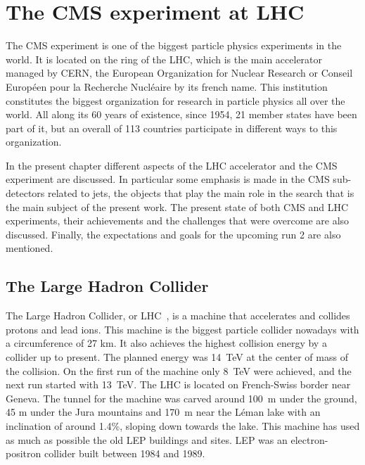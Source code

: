 \chapter[The CMS experiment at LHC]{The CMS experiment at LHC}

The CMS experiment is one of the biggest particle physics experiments in the world. It is located on the ring of the LHC, which is the main accelerator managed by CERN, the European Organization for Nuclear Research or Conseil Europ\'{e}en pour la Recherche Nucl\'{e}aire by its french name. This institution constitutes the biggest organization for research in particle physics all over the world. All along its 60 years of existence, since 1954, 21 member states have been part of it, but an overall of 113 countries participate in different ways to this organization. 

In the present chapter different aspects of the LHC accelerator and the CMS experiment are discussed. In particular some emphasis is made in the CMS sub-detectors related to jets, the objects that play the main role in the search that is the main subject of the present work. The present state of both CMS and LHC experiments, their achievements and the challenges that were overcome are also discussed. Finally, the expectations and goals for the upcoming run 2 are also mentioned.  

\section{The Large Hadron Collider}
\label{sec:LHC}

The Large Hadron Collider, or LHC~\cite{Bruning:782076}, is a machine that accelerates and collides protons and lead ions. This machine is the biggest particle collider nowadays with a circumference of 27 km. It also achieves the highest collision energy by a collider up to present. The planned energy was 14~TeV at the center of mass of the collision. On the first run of the machine only 8~TeV were achieved, and the next run started with 13~TeV. The LHC is located on French-Swiss border near Geneva. The tunnel for the machine was carved around 100~m under the ground, 45 m under the Jura mountains and 170~m near the L\'{e}man lake with an inclination of around 1.4\%, sloping down towards the lake. This machine has used as much as possible the old LEP buildings and sites. LEP was an electron-positron collider built between 1984 and 1989. 


